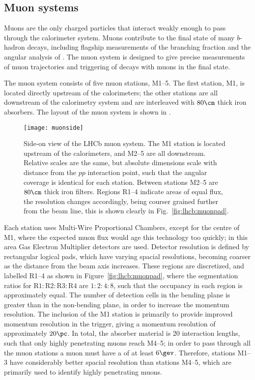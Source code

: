 \subsection{Muon systems}


Muons are the only charged particles that interact weakly enough to pass through the calorimeter
system.
Muons contribute to the final state of many $b$-hadron decays, including  flagship
measurements of  the branching fraction \decay{\Bs}{\mumu} and the angular analysis of
\decay{\Bd}{\Kstarz\mumu}.
The muon system is designed to give precise measurements of muon trajectories and triggering of
decays with muons in the final state.

The muon system consists of five muon stations, M1--5.
The first station, M1, is located directly upstream of the calorimeters; the other stations are all
downstream of the calorimetry system and are interleaved with $80\cm$ thick iron absorbers.
The layout of the \lhcb muon system is shown in .

\begin{figure}
  \begin{center}
    \texttt{[image: muonside]}
    \caption[Side-on diagram of the LHCb muon system]
    {
      Side-on view of the LHCb muon system.
      The M1 station is located upstream of the calorimeters, and M2--5 are all downstream.
      Relative scales are the same, but absolute dimensions scale with distance from the $pp$
      interaction point, such that the angular coverage is identical for each station.
      Between stations M2--5 are $80\cm$ thick iron filters.
      Regions R1--4 indicate areas of equal flux, the resolution changes accordingly, being courser
      grained further from the beam line, this is shown clearly in
      Fig.~\protect\ref{fig:lhcb:muonpad}.
    }
    \label{fig:lhcb:muonside}
  \end{center}
\end{figure}

Each station uses Multi-Wire Proportional Chambers, except for the centre of M1, where
the expected muon flux would age this technology too quickly; in this area Gas Electron Multiplier
detectors are used.
Detector resolution is defined by rectangular logical pads, which have varying spacial resolutions,
becoming coarser as the distance from the beam axis increases.
These regions are discretized, and labelled R1--4 as shown in Figure~\ref{fig:lhcb:muonpad},
where the segmentation ratios for $\mathrm{R}1:\mathrm{R}2:\mathrm{R}3:\mathrm{R}4$ are $1:2:4:8$,
such that the occupancy in each region is approximately equal.
The number of detection cells in the bending plane is greater than in the non-bending plane, in
order to increase the momentum resolution.
The inclusion of the M1 station is primarily to provide improved momentum resolution in the
trigger, giving a momentum resolution of approximately $20\pc$.
In total, the absorber material is 20 interaction lengths, such that only highly penetrating muons
reach M4--5; in order to pass through all the muon stations a muon must have a \pt of at least
$6\gev$.
Therefore, stations M1--3 have considerably better spacial resolution than stations M4--5, which
are primarily used to identify highly penetrating muons.


